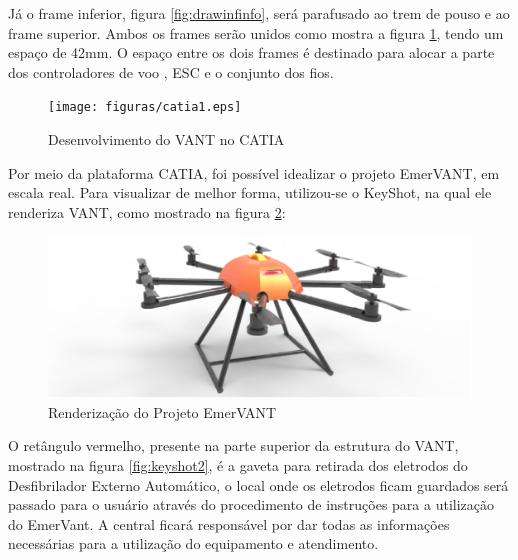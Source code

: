 Já o frame inferior, figura \ref{fig:drawinfinfo}, será parafusado ao trem de pouso e ao frame superior.  Ambos os frames serão unidos como mostra a figura \ref{fig:catia1}, tendo um espaço de 42mm. O espaço entre os dois frames é destinado para alocar a parte dos controladores de voo , ESC e o conjunto dos fios.

\begin{figure}[H]
    \centering
      \texttt{[image: figuras/catia1.eps]}
    \caption{Desenvolvimento do VANT no CATIA}
    \label{fig:catia1}
\end{figure}

Por meio da plataforma CATIA, foi possível idealizar o projeto EmerVANT, em escala real. Para visualizar de melhor forma, utilizou-se o KeyShot, na qual ele renderiza VANT, como mostrado na figura \ref{fig:keyshot1}:

\begin{figure}[H]
    \centering
      \includegraphics[keepaspectratio=true,scale=0.5]{figuras/keyshot1.eps}
    \caption{ Renderização do Projeto EmerVANT}
    \label{fig:keyshot1}
\end{figure}

O retângulo vermelho, presente na parte superior da estrutura do VANT, mostrado na figura \ref{fig:keyshot2}, é a gaveta para retirada dos eletrodos do Desfibrilador Externo Automático, o local onde os eletrodos ficam guardados será passado para o usuário através do procedimento de instruções para a utilização do EmerVant. A central ficará responsável por dar todas as informações necessárias para a utilização do equipamento e atendimento.

